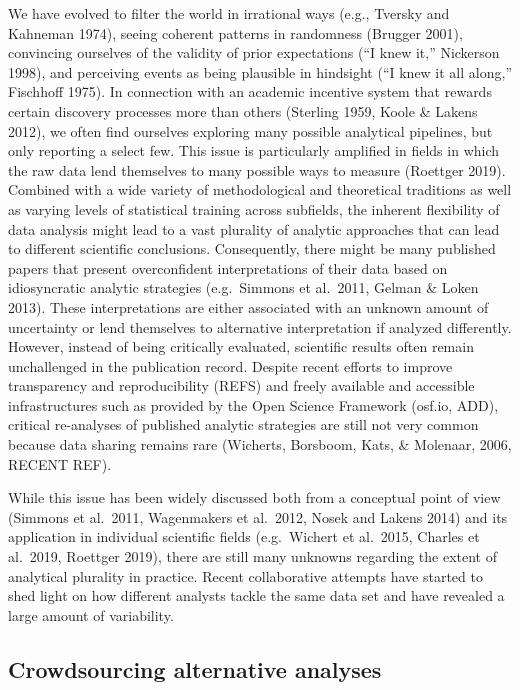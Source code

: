 \documentclass[
  english,
  man]{apa6}
\begin{document}
We have evolved to filter the world in irrational ways (e.g., Tversky and Kahneman 1974), seeing coherent patterns in randomness (Brugger 2001), convincing ourselves of the validity of prior expectations (``I knew it,'' Nickerson 1998), and perceiving events as being plausible in hindsight (``I knew it all along,'' Fischhoff 1975).
In connection with an academic incentive system that rewards certain discovery processes more than others (Sterling 1959, Koole \& Lakens 2012), we often find ourselves exploring many possible analytical pipelines, but only reporting a select few.
This issue is particularly amplified in fields in which the raw data lend themselves to many possible ways to measure (Roettger 2019).
Combined with a wide variety of methodological and theoretical traditions as well as varying levels of statistical training across subfields, the inherent flexibility of data analysis might lead to a vast plurality of analytic approaches that can lead to different scientific conclusions.
Consequently, there might be many published papers that present overconfident interpretations of their data based on idiosyncratic analytic strategies (e.g.~Simmons et al.~2011, Gelman \& Loken 2013).
These interpretations are either associated with an unknown amount of uncertainty or lend themselves to alternative interpretation if analyzed differently.
However, instead of being critically evaluated, scientific results often remain unchallenged in the publication record.
Despite recent efforts to improve transparency and reproducibility (REFS) and freely available and accessible infrastructures such as provided by the Open Science Framework (osf.io, ADD), critical re-analyses of published analytic strategies are still not very common because data sharing remains rare (Wicherts, Borsboom, Kats, \& Molenaar, 2006, RECENT REF).

While this issue has been widely discussed both from a conceptual point of view (Simmons et al.~2011, Wagenmakers et al.~2012, Nosek and Lakens 2014) and its application in individual scientific fields (e.g.~Wichert et al.~2015, Charles et al.~2019, Roettger 2019), there are still many unknowns regarding the extent of analytical plurality in practice.
Recent collaborative attempts have started to shed light on how different analysts tackle the same data set and have revealed a large amount of variability.

\hypertarget{crowdsourcing-alternative-analyses}{%
\subsection{Crowdsourcing alternative analyses}\label{crowdsourcing-alternative-analyses}}
\end{document}
